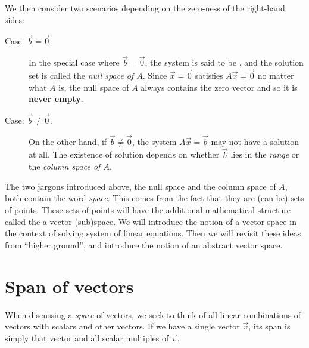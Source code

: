 \documentclass{ximera}
\begin{document}
We then consider two scenarios depending on the zero-ness of the right-hand
sides:
\begin{description}
\item[Case: $\vec{b} = \vec{0}$.] In the special case where
  $\vec{b} = \vec{0}$, the system is said to be , and
  the solution set is called the \textit{null space of $A$}. Since
  $\vec{x} = \vec{0}$ satisfies $A\vec{x} = \vec{0}$ no matter what
  $A$ is, the null space of $A$ always contains the zero vector and so
  it is \textbf{never empty}.
\item[Case: $\vec{b} \neq \vec{0}$.] On the other hand, if
  $\vec{b} \neq \vec{0}$, the system $A\vec{x} = \vec{b}$ may not have a
  solution at all.  The existence of solution depends on whether
  $\vec{b}$ lies in the \textit{range} or the \textit{column space of
    $A$}.
\end{description}

The two jargons introduced above, the null space and the column space of $A$,
both contain the word \textit{space}. This comes from the fact that they are
(can be) sets of points. These sets of points will have the additional
mathematical structure called the a vector (sub)space. We will introduce the
notion of a vector space in the context of solving system of linear equations.
Then we will revisit these ideas from ``higher ground'', and introduce the notion
of an abstract vector space.

\section{Span of vectors}

When discussing a \textit{space} of vectors, we seek to think of all linear
combinations of vectors with scalars and other vectors. If we have a single
vector $\vec{v}$, its span is simply that vector and all scalar
multiples of $\vec{v}$.
\end{document}
